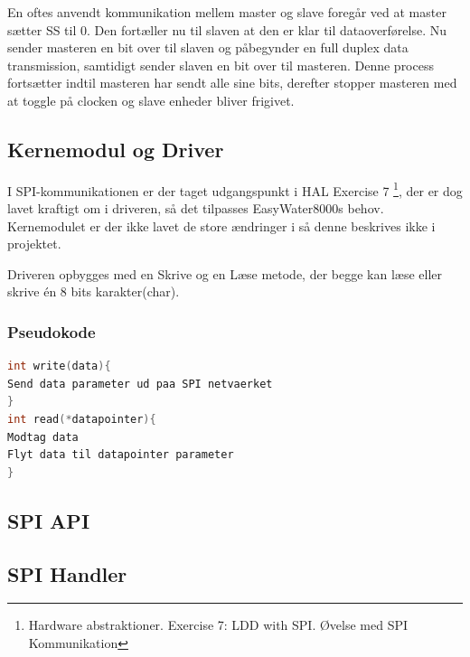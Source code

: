 En oftes anvendt kommunikation mellem master og slave foregår ved at master sætter SS til 0. Den fortæller nu til slaven at den er klar til 
dataoverførelse. Nu sender masteren en bit over til slaven og påbegynder en full duplex data transmission, samtidigt sender slaven en bit over
til masteren. Denne process fortsætter indtil masteren har sendt alle sine bits, derefter stopper masteren med at toggle på clocken og slave 
enheder bliver frigivet.

\subsection{Kernemodul og Driver}

I SPI-kommunikationen er der taget udgangspunkt i HAL Exercise 7 \footnote{Hardware abstraktioner. Exercise 7: LDD with SPI. Øvelse med SPI Kommunikation}, der er dog lavet kraftigt om i driveren, så det tilpasses EasyWater8000s behov. Kernemodulet er der ikke lavet de store ændringer i så denne beskrives ikke i projektet.

Driveren opbygges med en Skrive og en Læse metode, der begge kan læse eller skrive én 8 bits karakter(char).

\subsubsection*{Pseudokode}

\begin{lstlisting}[language=C]
int write(data){
Send data parameter ud paa SPI netvaerket
}
int read(*datapointer){
Modtag data
Flyt data til datapointer parameter
}
\end{lstlisting}


\subsection{SPI API}




\subsection{SPI Handler}
